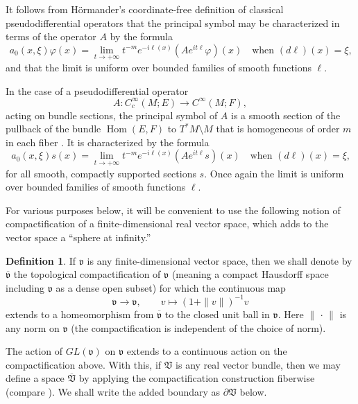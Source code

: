 \documentclass[leqno,11pt]{amsart}
\numberwithin{equation}{subsection}
\theoremstyle{plain}
\theoremstyle{definition}
\newtheorem{definition}[equation]{Definition}
\theoremstyle{remark}
\DeclareMathOperator{\Hom}{Hom}
\begin{document}
It follows from H\"ormander's coordinate-free definition of classical pseudodifferential operators that the principal symbol may be characterized in terms of the operator $A$ by the formula  
\[
a_0(x,\xi)\varphi (x)  = \lim_{t\to +\infty} t^{-m} e^{-i\ell(x)} (A e^{it \ell}\varphi)  (x)
\quad \text{when $(d\ell)(x)=\xi$,}
\]
and that the limit is uniform over bounded families of smooth functions $\ell$.

In the case of a pseudodifferential operator 
\[
A \colon C_c^\infty (M;E) \longrightarrow C^\infty (M;F) ,
\]
acting on bundle sections, the principal symbol of $A$ is a smooth section  of the pullback of the bundle $\Hom (E,F)$ to $T^*M\setminus M$ that is homogeneous of order $m$ in each fiber \cite[p.~92]{HormanderVolIII}.  It is characterized by the formula 
\begin{equation}
    \label{eq-limit-formula-for-principal-symbol}
a_0(x,\xi)s(x) = \lim_{t\to +\infty} t^{-m}e^{-i\ell(x)}( A  e^{it \ell}s)(x)
\quad \text{when $(d\ell)(x)=\xi$,}
\end{equation}
for all smooth, compactly supported sections $s$. Once again the limit is 
uniform over bounded families of smooth functions $\ell$.

For various purposes below, it  will be convenient to use the following notion of compactification of a   finite-dimensional real vector space, which adds to the vector space a ``sphere at infinity.''

\begin{definition}
\label{def-spherical-compactification}
  If $\mathfrak{v}$ is any finite-dimensional  vector  space, then we shall denote by $\overline{\mathfrak{v}}$ the topological compactification of $\mathfrak{v}$ (meaning a compact Hausdorff space including $\mathfrak{v}$ as a dense open subset) for which the continuous map 
  \[
 \mathfrak{v} \rightarrow  \mathfrak{v} , \qquad v \mapsto (1{+}\|v\|) ^{-1}  v
  \]
  extends to a homeomorphism from $\overline {\mathfrak{v}} $ to the closed unit ball in $\mathfrak{v}$.  Here $\|\,\cdot \, \|$ is any norm on $\mathfrak{v}$ (the compactification is independent of the choice of norm).
\end{definition}

The action of $GL(\mathfrak{v})$ on $\mathfrak{v}$ extends to a continuous action on the compactification above.  With this, if $\mathfrak{V}$ is any real vector bundle, then we may define a space $\overline{\mathfrak{V}}$ by applying the compactification construction fiberwise (compare \cite[Sec.\ 1.2]{Atiyah67}). We shall write the added boundary as $\partial \mathfrak{V}$ below.
\end{document}
